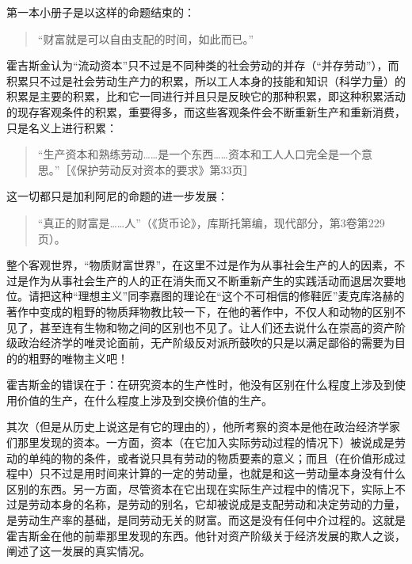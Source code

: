第一本小册子是以这样的命题结束的：

\begin{quote}{“财富就是可以自由支配的时间，如此而已。”}\end{quote}


霍吉斯金认为“流动资本”只不过是不同种类的社会劳动的并存（“并存劳动”），而积累只不过是社会劳动生产力的积累，所以工人本身的技能和知识（科学力量）的积累是主要的积累，比和它一同进行并且只是反映它的那种积累，即这种积累活动的现存客观条件的积累，重要得多，而这些客观条件会不断重新生产和重新消费，只是名义上进行积累：

\begin{quote}{“生产资本和熟练劳动……是一个东西……资本和工人人口完全是一个意思。”［《保护劳动反对资本的要求》第33页］}\end{quote}

这一切都只是加利阿尼的命题的进一步发展：

\begin{quote}{“真正的财富是……人”（《货币论》，库斯托第编，现代部分，第3卷第229页）。}\end{quote}

整个客观世界，“物质财富世界”，在这里不过是作为从事社会生产的人的因素，不过是作为从事社会生产的人的正在消失而又不断重新产生的实践活动而退居次要地位。请把这种“理想主义”同李嘉图的理论在“这个不可相信的修鞋匠”麦克库洛赫的著作中变成的粗野的物质拜物教比较一下，在他的著作中，不仅人和动物的区别不见了，甚至连有生物和物之间的区别也不见了。让人们还去说什么在崇高的资产阶级政治经济学的唯灵论面前，无产阶级反对派所鼓吹的只是以满足鄙俗的需要为目的的粗野的唯物主义吧！

霍吉斯金的错误在于：在研究资本的生产性时，他没有区别在什么程度上涉及到使用价值的生产，在什么程度上涉及到交换价值的生产。

其次（但是从历史上说这是有它的理由的），他所考察的资本是他在政治经济学家们那里发现的资本。一方面，资本（在它加入实际劳动过程的情况下）被说成是劳动的单纯的物的条件，或者说只具有劳动的物质要素的意义；而且（在价值形成过程中）只不过是用时间来计算的一定的劳动量，也就是和这一劳动量本身没有什么区别的东西。另一方面，尽管资本在它出现在实际生产过程中的情况下，实际上不过是劳动本身的名称，是劳动的别名，它却被说成是支配劳动和决定劳动的力量，是劳动生产率的基础，是同劳动无关的财富。而这是没有任何中介过程的。这就是霍吉斯金在他的前辈那里发现的东西。他针对资产阶级关于经济发展的欺人之谈，阐述了这一发展的真实情况。

